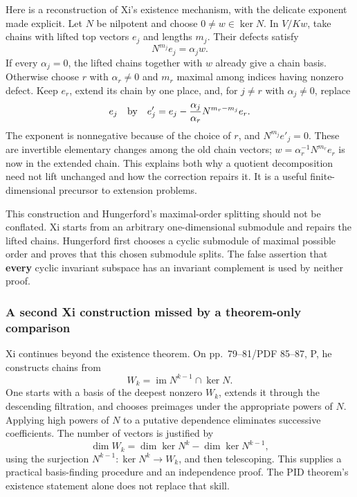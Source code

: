 \documentclass[
  11pt,
]{article}
\begin{document}
Here is a reconstruction of Xi's existence mechanism, with the delicate
exponent made explicit. Let \(N\) be nilpotent and choose
\(0\ne w\in\ker N\). In \(V/Kw\), take chains with lifted top vectors
\(e_j\) and lengths \(m_j\). Their defects satisfy \[
N^{m_j}e_j=\alpha_jw.
\] If every \(\alpha_j=0\), the lifted chains together with \(w\)
already give a chain basis. Otherwise choose \(r\) with \(\alpha_r\ne0\)
and \(m_r\) maximal among indices having nonzero defect. Keep \(e_r\),
extend its chain by one place, and, for \(j\ne r\) with
\(\alpha_j\ne0\), replace \[
e_j\quad\hbox{by}\quad
e'_j=e_j-\frac{\alpha_j}{\alpha_r}N^{m_r-m_j}e_r.
\] The exponent is nonnegative because of the choice of \(r\), and
\(N^{m_j}e'_j=0\). These are invertible elementary changes among the old
chain vectors; \(w=\alpha_r^{-1}N^{m_r}e_r\) is now in the extended
chain. This explains both why a quotient decomposition need not lift
unchanged and how the correction repairs it. It is a useful
finite-dimensional precursor to extension problems.

This construction and Hungerford's maximal-order splitting should not be
conflated. Xi starts from an arbitrary one-dimensional submodule and
repairs the lifted chains. Hungerford first chooses a cyclic submodule
of maximal possible order and proves that this chosen submodule splits.
The false assertion that \textbf{every} cyclic invariant subspace has an
invariant complement is used by neither proof.

\subsubsection{A second Xi construction missed by a theorem-only
comparison}\label{a-second-xi-construction-missed-by-a-theorem-only-comparison}

Xi continues beyond the existence theorem. On pp.~79--81/PDF 85--87, P,
he constructs chains from \[
W_k=\operatorname{im}N^{k-1}\cap\ker N.
\] One starts with a basis of the deepest nonzero \(W_k\), extends it
through the descending filtration, and chooses preimages under the
appropriate powers of \(N\). Applying high powers of \(N\) to a putative
dependence eliminates successive coefficients. The number of vectors is
justified by \[
\dim W_k=\dim\ker N^k-\dim\ker N^{k-1},
\] using the surjection \(N^{k-1}:\ker N^k\to W_k\), and then
telescoping. This supplies a practical basis-finding procedure and an
independence proof. The PID theorem's existence statement alone does not
replace that skill.
\end{document}
